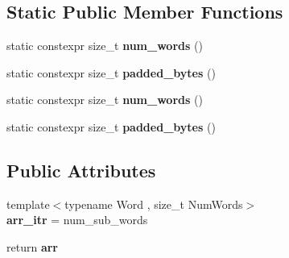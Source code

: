 \subsection*{Static Public Member Functions}
\begin{DoxyCompactItemize}
\item 
\mbox{\label{classaacio_1_1fixed__key_a920ca7f7c03d94097b2bf81caf8c6ee3}} 
static constexpr size\+\_\+t {\bfseries num\+\_\+words} ()
\item 
\mbox{\label{classaacio_1_1fixed__key_a780c10084af4df49dcca24a5d8981b76}} 
static constexpr size\+\_\+t {\bfseries padded\+\_\+bytes} ()
\item 
\mbox{\label{classaacio_1_1fixed__key_a920ca7f7c03d94097b2bf81caf8c6ee3}} 
static constexpr size\+\_\+t {\bfseries num\+\_\+words} ()
\item 
\mbox{\label{classaacio_1_1fixed__key_a780c10084af4df49dcca24a5d8981b76}} 
static constexpr size\+\_\+t {\bfseries padded\+\_\+bytes} ()
\end{DoxyCompactItemize}
\subsection*{Public Attributes}
\begin{DoxyCompactItemize}
\item 
\mbox{\label{classaacio_1_1fixed__key_ac03120d7a1c48f7457f83994bdd3afdd}} 
{\footnotesize template$<$typename Word , size\+\_\+t Num\+Words$>$ }\\{\bfseries arr\+\_\+itr} = num\+\_\+sub\+\_\+words
\item 
\mbox{\label{classaacio_1_1fixed__key_a82085b95f7df55967c896ce0a9be59d6}} 
return {\bfseries arr}
\end{DoxyCompactItemize}
